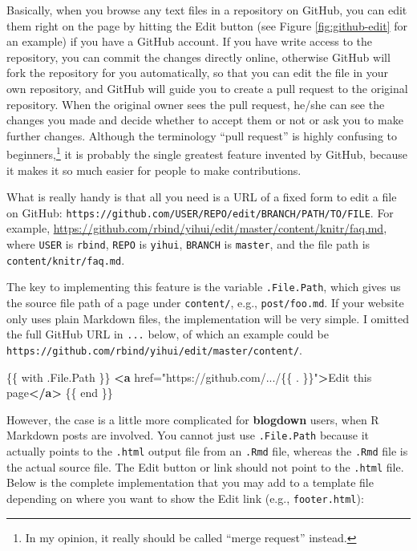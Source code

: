 \documentclass[12pt,]{krantz}
\makeatletter
\newenvironment{Shaded}{\begin{snugshade}}{\end{snugshade}}
\newcommand{\KeywordTok}[1]{\textcolor[rgb]{0.13,0.29,0.53}{\textbf{#1}}}
\newcommand{\StringTok}[1]{\textcolor[rgb]{0.31,0.60,0.02}{#1}}
\newcommand{\OtherTok}[1]{\textcolor[rgb]{0.56,0.35,0.01}{#1}}
\newcommand{\NormalTok}[1]{#1}
\newenvironment{kframe}{%
\medskip{}
\setlength{\fboxsep}{.8em}
 \def\at@end@of@kframe{}%
 \ifinner\ifhmode%
  \def\at@end@of@kframe{\end{minipage}}%
  \begin{minipage}{\columnwidth}%
 \fi\fi%
 \def\FrameCommand##1{\hskip\@totalleftmargin \hskip-\fboxsep
 \colorbox{shadecolor}{##1}\hskip-\fboxsep
     \hskip-\linewidth \hskip-\@totalleftmargin \hskip\columnwidth}%
 \MakeFramed {\advance\hsize-\width
   \@totalleftmargin\z@ \linewidth\hsize
   \@setminipage}}%
 {\par\unskip\endMakeFramed%
 \at@end@of@kframe}
\renewenvironment{Shaded}{\begin{kframe}}{\end{kframe}}
\theoremstyle{definition}
\theoremstyle{definition}
\theoremstyle{definition}
\theoremstyle{remark}
\makeatother
\begin{document}
\begin{itemize}
  Basically, when you browse any text files in a repository on GitHub,
  you can edit them right on the page by hitting the Edit button (see
  Figure \ref{fig:github-edit} for an example) if you have a GitHub
  account. If you have write access to the repository, you can commit
  the changes directly online, otherwise GitHub will fork the repository
  for you automatically, so that you can edit the file in your own
  repository, and GitHub will guide you to create a pull request to the
  original repository. When the original owner sees the pull request,
  he/she can see the changes you made and decide whether to accept them
  or not or ask you to make further changes. Although the terminology
  ``pull request'' is highly confusing to beginners,\footnote{In my
    opinion, it really should be called ``merge request'' instead.} it
  is probably the single greatest feature invented by GitHub, because it
  makes it so much easier for people to make contributions.

  What is really handy is that all you need is a URL of a fixed form to
  edit a file on GitHub:
  \texttt{https://github.com/USER/REPO/edit/BRANCH/PATH/TO/FILE}. For
  example,
  \url{https://github.com/rbind/yihui/edit/master/content/knitr/faq.md},
  where \texttt{USER} is \texttt{rbind}, \texttt{REPO} is
  \texttt{yihui}, \texttt{BRANCH} is \texttt{master}, and the file path
  is \texttt{content/knitr/faq.md}.

  The key to implementing this feature is the variable
  \texttt{.File.Path}, which gives us the source file path of a page
  under \texttt{content/}, e.g., \texttt{post/foo.md}. If your website
  only uses plain Markdown files, the implementation will be very
  simple. I omitted the full GitHub URL in \texttt{...} below, of which
  an example could be
  \texttt{https://github.com/rbind/yihui/edit/master/content/}.

\begin{Shaded}
\begin{Highlighting}[]
\NormalTok{\{\{ with .File.Path \}\}}
\KeywordTok{<a}\OtherTok{ href=}\StringTok{"https://github.com/.../\{\{ . \}\}"}\KeywordTok{>}\NormalTok{Edit this page}\KeywordTok{</a>}
\NormalTok{\{\{ end \}\}}
\end{Highlighting}
\end{Shaded}

  However, the case is a little more complicated for \textbf{blogdown}
  users, when R Markdown posts are involved. You cannot just use
  \texttt{.File.Path} because it actually points to the \texttt{.html}
  output file from an \texttt{.Rmd} file, whereas the \texttt{.Rmd} file
  is the actual source file. The Edit button or link should not point to
  the \texttt{.html} file. Below is the complete implementation that you
  may add to a template file depending on where you want to show the
  Edit link (e.g., \texttt{footer.html}):


\end{itemize}
\end{document}
